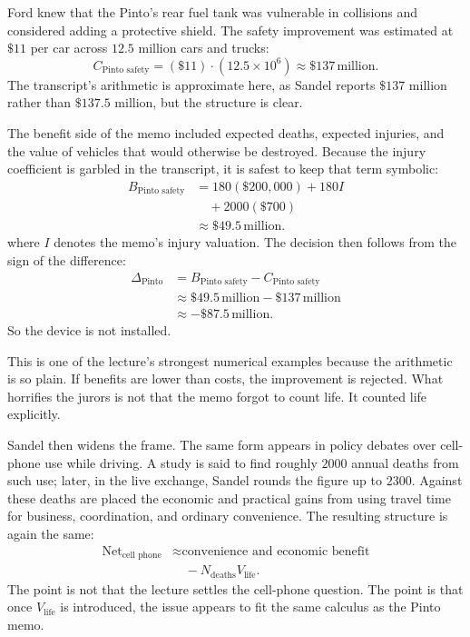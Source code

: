 Ford knew that the Pinto's rear fuel tank was vulnerable in collisions and considered adding a protective shield. The safety improvement was estimated at \(\$11\) per car across \(12.5\) million cars and trucks:
\begin{equation}
C_{\text{Pinto safety}}=(\$11)\cdot(12.5\times 10^6)\approx \$137\,\text{million}.
\end{equation}
The transcript's arithmetic is approximate here, as Sandel reports \(\$137\) million rather than \(\$137.5\) million, but the structure is clear.

The benefit side of the memo included expected deaths, expected injuries, and the value of vehicles that would otherwise be destroyed. Because the injury coefficient is garbled in the transcript, it is safest to keep that term symbolic:
\begin{equation}
\begin{aligned}
B_{\text{Pinto safety}}
&=180(\$200{,}000)+180I \\
&\quad+2000(\$700) \\
&\approx \$49.5\,\text{million}.
\end{aligned}
\end{equation}
where \(I\) denotes the memo's injury valuation. The decision then follows from the sign of the difference:
\begin{align}
\Delta_{\text{Pinto}}
&=B_{\text{Pinto safety}}-C_{\text{Pinto safety}} \nonumber\\
&\approx \$49.5\,\text{million}-\$137\,\text{million} \nonumber\\
&\approx -\$87.5\,\text{million}.
\end{align}
So the device is not installed.

This is one of the lecture's strongest numerical examples because the arithmetic is so plain. If benefits are lower than costs, the improvement is rejected. What horrifies the jurors is not that the memo forgot to count life. It counted life explicitly.

Sandel then widens the frame. The same form appears in policy debates over cell-phone use while driving. A study is said to find roughly \(2000\) annual deaths from such use; later, in the live exchange, Sandel rounds the figure up to \(2300\). Against these deaths are placed the economic and practical gains from using travel time for business, coordination, and ordinary convenience. The resulting structure is again the same:
\begin{equation}
\begin{aligned}
\text{Net}_{\text{cell phone}}
&\approx \text{convenience and economic benefit} \\
&\quad - N_{\text{deaths}}V_{\text{life}}.
\end{aligned}
\end{equation}
The point is not that the lecture settles the cell-phone question. The point is that once \(V_{\text{life}}\) is introduced, the issue appears to fit the same calculus as the Pinto memo.

